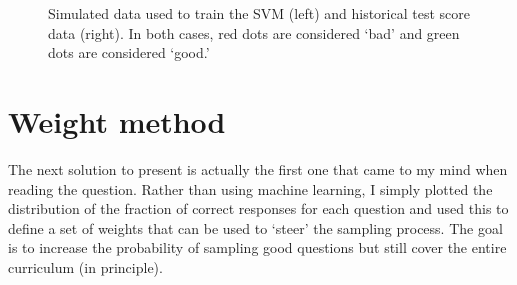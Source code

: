 \documentclass[twoside,11pt, letter]{article}
\newcommand{\1}[1]{\, \mathrm{#1}} %
\begin{document}
\begin{figure}
\begin{center}
\caption{Simulated data used to train the SVM (left) and historical test score data (right).  In both cases, red dots are considered `bad' and green dots are considered `good.'}
\end{center}
\end{figure}

\newpage

\section{Weight method}
The next solution to present is actually the first one that came to my mind when reading the question.
Rather than using machine learning, I simply plotted the distribution of the fraction of correct responses for each question and used this to define a set of weights that can be used to `steer' the sampling process.
The goal is to increase the probability of sampling good questions but still cover the entire curriculum (in principle).
\end{document}
